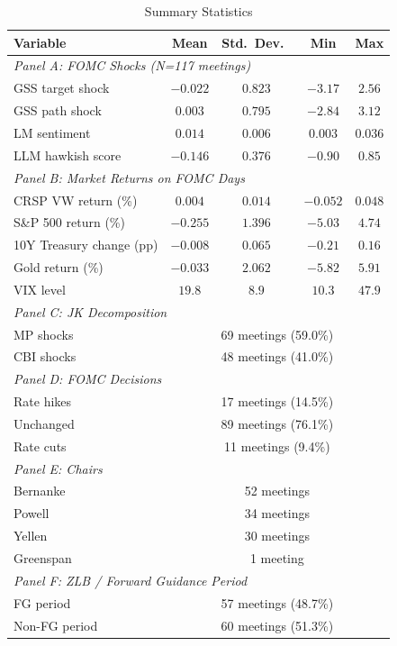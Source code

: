 \documentclass[11pt,a4paper]{article}
\begin{document}
\begin{table}[H]
\centering
\caption{Summary Statistics}
\label{tab:summary}
\begin{tabular}{lcccc}
\toprule
Variable & Mean & Std.\ Dev.\ & Min & Max \\
\midrule
\multicolumn{5}{l}{\textit{Panel A: FOMC Shocks (N=117 meetings)}} \\
\midrule
GSS target shock & $-0.022$ & $0.823$ & $-3.17$ & $2.56$ \\
GSS path shock & $0.003$ & $0.795$ & $-2.84$ & $3.12$ \\
LM sentiment & $0.014$ & $0.006$ & $0.003$ & $0.036$ \\
LLM hawkish score & $-0.146$ & $0.376$ & $-0.90$ & $0.85$ \\
\midrule
\multicolumn{5}{l}{\textit{Panel B: Market Returns on FOMC Days}} \\
\midrule
CRSP VW return (\%) & $0.004$ & $0.014$ & $-0.052$ & $0.048$ \\
S\&P 500 return (\%) & $-0.255$ & $1.396$ & $-5.03$ & $4.74$ \\
10Y Treasury change (pp) & $-0.008$ & $0.065$ & $-0.21$ & $0.16$ \\
Gold return (\%) & $-0.033$ & $2.062$ & $-5.82$ & $5.91$ \\
VIX level & $19.8$ & $8.9$ & $10.3$ & $47.9$ \\
\midrule
\multicolumn{5}{l}{\textit{Panel C: JK Decomposition}} \\
\midrule
MP shocks & \multicolumn{4}{c}{69 meetings (59.0\%)} \\
CBI shocks & \multicolumn{4}{c}{48 meetings (41.0\%)} \\
\midrule
\multicolumn{5}{l}{\textit{Panel D: FOMC Decisions}} \\
\midrule
Rate hikes & \multicolumn{4}{c}{17 meetings (14.5\%)} \\
Unchanged & \multicolumn{4}{c}{89 meetings (76.1\%)} \\
Rate cuts & \multicolumn{4}{c}{11 meetings (9.4\%)} \\
\midrule
\multicolumn{5}{l}{\textit{Panel E: Chairs}} \\
\midrule
Bernanke & \multicolumn{4}{c}{52 meetings} \\
Powell & \multicolumn{4}{c}{34 meetings} \\
Yellen & \multicolumn{4}{c}{30 meetings} \\
Greenspan & \multicolumn{4}{c}{1 meeting} \\
\midrule
\multicolumn{5}{l}{\textit{Panel F: ZLB / Forward Guidance Period}} \\
\midrule
FG period & \multicolumn{4}{c}{57 meetings (48.7\%)} \\
Non-FG period & \multicolumn{4}{c}{60 meetings (51.3\%)} \\
\bottomrule
\end{tabular}
\end{table}
\end{document}
